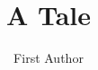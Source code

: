 \documentclass[11pt]{afthesis}
\author{First Author}
\title{A Tale}
\begin{document}
\flyleaf
\disclaimerpage
\titlepage
\end{document}

